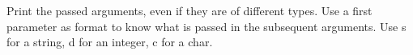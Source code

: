  
Print the passed arguments, even if they are of different types.
Use a first parameter as format to know what is passed in the subsequent arguments.
Use s for a string, d for an integer, c for a char.
